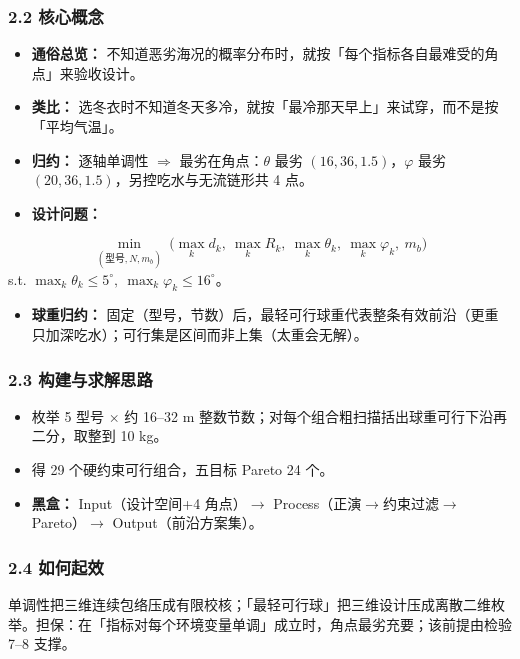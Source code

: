 \documentclass[UTF8,a4paper,zihao=-4]{ctexart}
\begin{document}
\subsubsection{\texorpdfstring{2.2 核心概念}{2.2 核心概念}}
\begin{itemize}[leftmargin=1.5em]
\item \textbf{通俗总览：} 不知道恶劣海况的概率分布时，就按「每个指标各自最难受的角点」来验收设计。
\item \textbf{类比：} 选冬衣时不知道冬天多冷，就按「最冷那天早上」来试穿，而不是按「平均气温」。
\item \textbf{归约：} 逐轴单调性 $\Rightarrow$ 最劣在角点：\(\theta\) 最劣 \((16,36,1.5)\)，\(\varphi\) 最劣 \((20,36,1.5)\)，另控吃水与无流链形共 4 点。
\item \textbf{设计问题：}
\end{itemize}
  \[
  \min_{(\text{型号},N,m_b)}\ \bigl(\max_k d_k,\ \max_k R_k,\ \max_k\theta_k,\ \max_k\varphi_k,\ m_b\bigr)
  \]
  s.t. \(\max_k\theta_k\le5^\circ,\ \max_k\varphi_k\le16^\circ\)。
\begin{itemize}[leftmargin=1.5em]
\item \textbf{球重归约：} 固定（型号，节数）后，最轻可行球重代表整条有效前沿（更重只加深吃水）；可行集是区间而非上集（太重会无解）。
\end{itemize}

\subsubsection{\texorpdfstring{2.3 构建与求解思路}{2.3 构建与求解思路}}
\begin{itemize}[leftmargin=1.5em]
\item 枚举 5 型号 $\times$ 约 16--32 m 整数节数；对每个组合粗扫描括出球重可行下沿再二分，取整到 10 kg。
\item 得 29 个硬约束可行组合，五目标 Pareto 24 个。
\item \textbf{黑盒：} Input（设计空间+4 角点）$\rightarrow$ Process（正演$\rightarrow$约束过滤$\rightarrow$Pareto）$\rightarrow$ Output（前沿方案集）。
\end{itemize}

\subsubsection{\texorpdfstring{2.4 如何起效}{2.4 如何起效}}
单调性把三维连续包络压成有限校核；「最轻可行球」把三维设计压成离散二维枚举。担保：在「指标对每个环境变量单调」成立时，角点最劣充要；该前提由检验 7--8 支撑。
\end{document}
